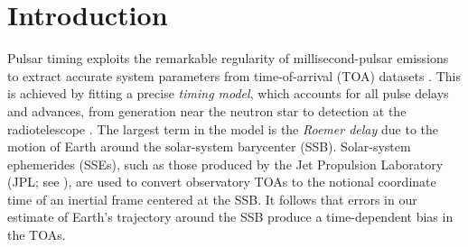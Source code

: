 \documentclass[iop,apj,twocolappendix]{emulateapj}
\begin{document}

\section{Introduction}
\label{sec:intro}

Pulsar timing exploits the remarkable regularity of millisecond-pulsar emissions to extract accurate system parameters from time-of-arrival (TOA) datasets \citep{2012hpa..book.....L}.
This is achieved by fitting a precise \emph{timing model}, which accounts for all pulse delays and advances, from generation near the neutron star to detection at the radiotelescope \citep{2013CQGra..30v4001L}.
The largest term in the model is the \emph{Roemer delay} \citep{roemer1676} due to the motion of Earth around the solar-system barycenter (SSB). Solar-system ephemerides (SSEs), such as those produced by the Jet Propulsion Laboratory (JPL; see \citealt{2009IPNPR.178C...1F,2014IPNPR.196C...1F,de435,de436,de438}), are used to convert observatory TOAs to the notional coordinate time of an inertial frame centered at the SSB.
It follows that errors in our estimate of Earth's trajectory around the SSB produce a time-dependent bias in the TOAs.
\end{document}
